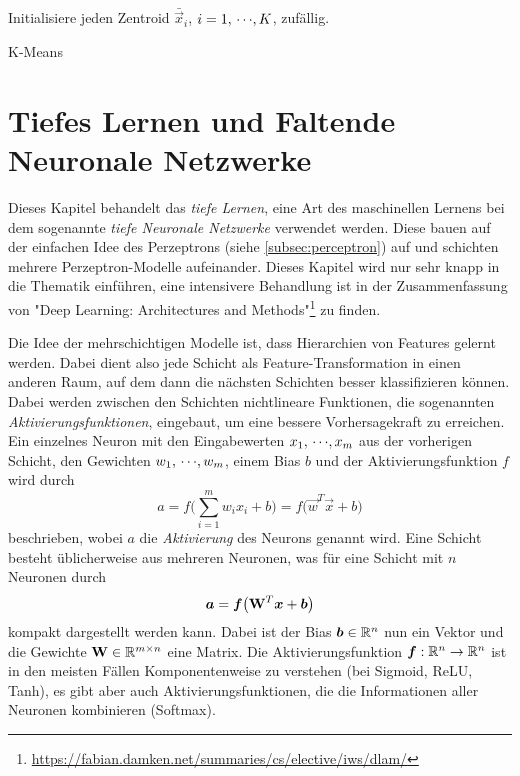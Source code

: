 		\begin{algorithm}  \DontPrintSemicolon
			Initialisiere jeden Zentroid \( \bar{\vec{x}}_i \), \( i = 1,\,\cdots\!,K \), \bspw zufällig. \;
			\caption{K-Means}
			\label{alg:kMean}
		\end{algorithm}

\chapter{Tiefes Lernen und Faltende Neuronale Netzwerke}
	\label{c:deepLearning}

	Dieses Kapitel behandelt das \emph{tiefe Lernen}, eine Art des maschinellen Lernens bei dem sogenannte \emph{tiefe Neuronale Netzwerke} verwendet werden. Diese bauen auf der einfachen Idee des Perzeptrons (siehe \autoref{subsec:perceptron}) auf und schichten mehrere Perzeptron-Modelle aufeinander. Dieses Kapitel wird nur sehr knapp in die Thematik einführen, eine intensivere Behandlung ist in der Zusammenfassung von "Deep Learning: Architectures and Methods"\footnote{\url{https://fabian.damken.net/summaries/cs/elective/iws/dlam/}} zu finden.

	Die Idee der mehrschichtigen Modelle ist, dass Hierarchien von Features gelernt werden. Dabei dient also jede Schicht als Feature-Transformation in einen anderen Raum, auf dem dann die nächsten Schichten besser klassifizieren können. Dabei werden zwischen den Schichten nichtlineare Funktionen, die sogenannten \emph{Aktivierungsfunktionen}, eingebaut, um eine bessere Vorhersagekraft zu erreichen. Ein einzelnes Neuron mit den Eingabewerten \( x_1,\,\cdots\!,x_m \) aus der vorherigen Schicht, den Gewichten \( w_1,\,\cdots\!,w_m \), einem Bias \(b\) und der Aktivierungsfunktion \(f\) wird durch
	\begin{equation}
		a = f\Bigg(\! \sum_{i = 1}^{m} w_i x_i + b \!\Bigg) = f\big( \vec{w}^T \vec{x} + b \big)
	\end{equation}
	beschrieben, wobei \(a\) die \emph{Aktivierung} des Neurons genannt wird. Eine Schicht besteht üblicherweise aus mehreren Neuronen, was für eine Schicht mit \(n\) Neuronen durch
	\begin{equation}
		\bm{a} = \bm{f}\big( \bm{\mathrm{W}}^T \bm{x} + \bm{b} \big)
	\end{equation}
	kompakt dargestellt werden kann. Dabei ist der Bias \( \bm{b} \in \mathbb{R}^n \) nun ein Vektor und die Gewichte \( \bm{\mathrm{W}} \in \mathbb{R}^{m \times n} \) eine Matrix. Die Aktivierungsfunktion \(\bm{f} : \mathbb{R}^n \to \mathbb{R}^n\) ist in den meisten Fällen Komponentenweise zu verstehen (\zB bei Sigmoid, ReLU, Tanh), es gibt aber auch Aktivierungsfunktionen, die die Informationen aller Neuronen kombinieren (\zB Softmax).

